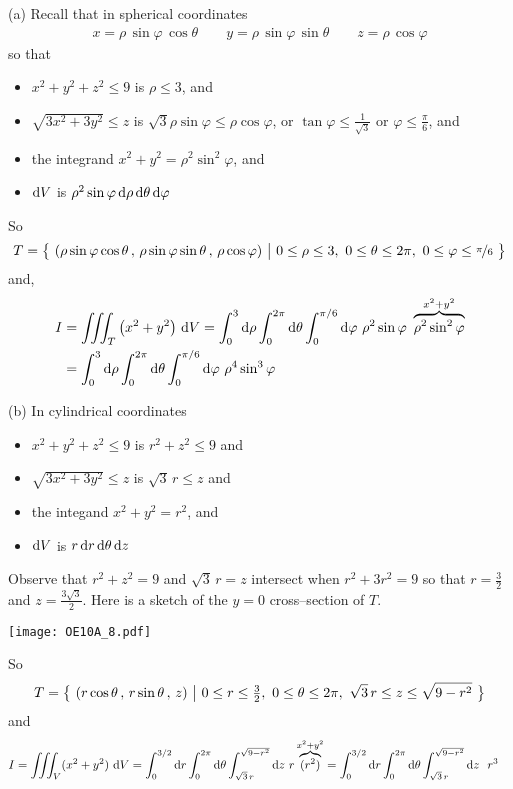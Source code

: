 \begin{solution}
(a)
Recall that in spherical coordinates
\begin{align*}
x=\rho\,\sin\varphi\,\cos\theta\qquad
y=\rho\,\sin\varphi\,\sin\theta\qquad
z=\rho\,\cos\varphi
\end{align*}
so that 
\begin{itemize}
\item
$x^2+y^2+z^2\le 9$ is $\rho\le 3$, and
\item
$\sqrt{3x^2+3y^2}\le z$ is $\sqrt{3}\rho\sin\varphi\le \rho\cos\varphi$,
or $\tan\varphi\le \frac{1}{\sqrt{3}}$ or $\varphi\le\frac{\pi}{6}$, and
\item
the integrand $x^2+y^2=\rho^2\sin^2\varphi$, and
\item
$\mathrm{d}V$ is $\rho^2\sin\varphi\,\mathrm{d}\rho\,\mathrm{d}\theta\,\mathrm{d}\varphi$
\end{itemize}
So
\begin{equation*}
T =\Set{(\rho\sin\varphi\cos\theta\,,\,\rho\sin\varphi\sin\theta\,,\,
          \rho\cos\varphi)}{0\le\rho\le 3,\  0\le\theta\le2\pi,\ 
                            0\le \varphi\le \nicefrac{\pi}{6}}
\end{equation*}
and, 
\begin{align*}
I &=\tripInt_T \big(x^2+y^2\big)\ \dee{V} 
   =\int_0^{3}\dee{\rho}\int_0^{2\pi}\dee{\theta}
           \int_0^{\pi/6}\dee{\varphi}\ \rho^2\sin\varphi\ 
           \overbrace{\rho^2\sin^2\varphi}^{x^2+y^2} \\
   &=\int_0^{3}\dee{\rho}\int_0^{2\pi}\dee{\theta}
           \int_0^{\pi/6}\dee{\varphi}\ \rho^4\sin^3\varphi
\end{align*}

(b)
In cylindrical coordinates
\begin{itemize}
\item
$x^2+y^2+z^2\le 9$ is $r^2+z^2\le 9$ and
\item
$\sqrt{3 x^2+3 y^2}\le z$ is $\sqrt{3}\,r\le z$ and
\item
the integand $x^2+y^2=r^2$, and
\item
$\mathrm{d}V$ is $r\,\mathrm{d}r\,\mathrm{d}\theta\,\mathrm{d}z$
\end{itemize}
Observe that $r^2+z^2= 9$ and $\sqrt{3}\,r= z$ intersect when $r^2+3r^2=9$ so that $r=\frac{3}{2}$ and $z=\frac{3\sqrt{3}}{2}$.
Here is a sketch of the $y=0$ cross--section of $T$.
\begin{center}
     \texttt{[image: OE10A\_8.pdf]}
\end{center}
So
\begin{equation*}
T =\Set{(r\cos\theta\,,\,r\sin\theta\,,\,z)}{0\le r\le \tfrac{3}{2},\ 
                                             0\le\theta\le2\pi,\ 
                                          \sqrt{3}\,r\le z\le \sqrt{9-r^2}}
\end{equation*}
and
\begin{align*}
I &=\tripInt_V (x^2+y^2)\ \dee{V} 
   =\int_0^{3/2}\dee{r}\int_0^{2\pi}\dee{\theta}
           \int_{\sqrt{3}\,r}^{\sqrt{9-r^2}}\dee{z}\ 
                               r\overbrace{(r^2)}^{x^2+y^2}
   =\int_0^{3/2}\dee{r}\int_0^{2\pi}\dee{\theta}
                          \int_{\sqrt{3}\,r}^{\sqrt{9-r^2}}\dee{z}\ \ r^3
\end{align*}



\end{solution}
